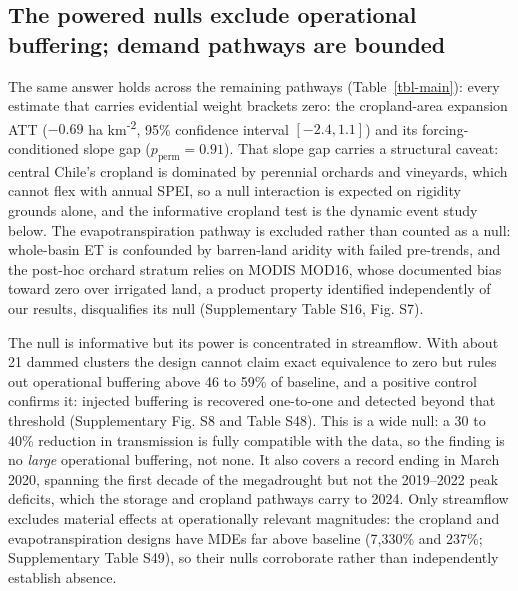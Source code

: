 \documentclass[
]{agujournal2019}
\begin{document}
\subsection{The powered nulls exclude operational buffering; demand
pathways are bounded}\label{sec-bounding}

The same answer holds across the remaining pathways
(Table~\ref{tbl-main}): every estimate that carries evidential weight
brackets zero: the cropland-area expansion ATT (\(-0.69\) ha
km\textsuperscript{-2}, 95\% confidence interval \([-2.4, 1.1]\)) and
its forcing-conditioned slope gap (\(p_{\text{perm}} = 0.91\)). That
slope gap carries a structural caveat: central Chile's cropland is
dominated by perennial orchards and vineyards, which cannot flex with
annual SPEI, so a null interaction is expected on rigidity grounds
alone, and the informative cropland test is the dynamic event study
below. The evapotranspiration pathway is excluded rather than counted as
a null: whole-basin ET is confounded by barren-land aridity with failed
pre-trends, and the post-hoc orchard stratum relies on MODIS MOD16,
whose documented bias toward zero over irrigated land, a product
property identified independently of our results, disqualifies its null
(Supplementary Table S16, Fig. S7).

The null is informative but its power is concentrated in streamflow.
With about 21 dammed clusters the design cannot claim exact equivalence
to zero but rules out operational buffering above 46 to 59\% of
baseline, and a positive control confirms it: injected buffering is
recovered one-to-one and detected beyond that threshold (Supplementary
Fig. S8 and Table S48). This is a wide null: a 30 to 40\% reduction in
transmission is fully compatible with the data, so the finding is no
\emph{large} operational buffering, not none. It also covers a record
ending in March 2020, spanning the first decade of the megadrought but
not the 2019--2022 peak deficits, which the storage and cropland
pathways carry to 2024. Only streamflow excludes material effects at
operationally relevant magnitudes: the cropland and evapotranspiration
designs have MDEs far above baseline (7,330\% and 237\%; Supplementary
Table S49), so their nulls corroborate rather than independently
establish absence.
\end{document}
